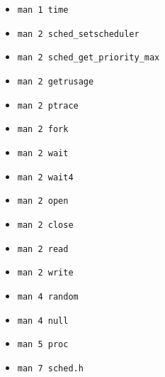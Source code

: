 \documentclass[12pt]{article}
\begin{document}
\begin{itemize}
\item \texttt{man 1 time}
\item \texttt{man 2 sched\_setscheduler}
\item \texttt{man 2 sched\_get\_priority\_max}
\item \texttt{man 2 getrusage}
\item \texttt{man 2 ptrace}
\item \texttt{man 2 fork}
\item \texttt{man 2 wait}
\item \texttt{man 2 wait4}
\item \texttt{man 2 open}
\item \texttt{man 2 close}
\item \texttt{man 2 read}
\item \texttt{man 2 write}
\item \texttt{man 4 random}
\item \texttt{man 4 null}
\item \texttt{man 5 proc}
\item \texttt{man 7 sched.h}
\end{itemize}
\end{document}
